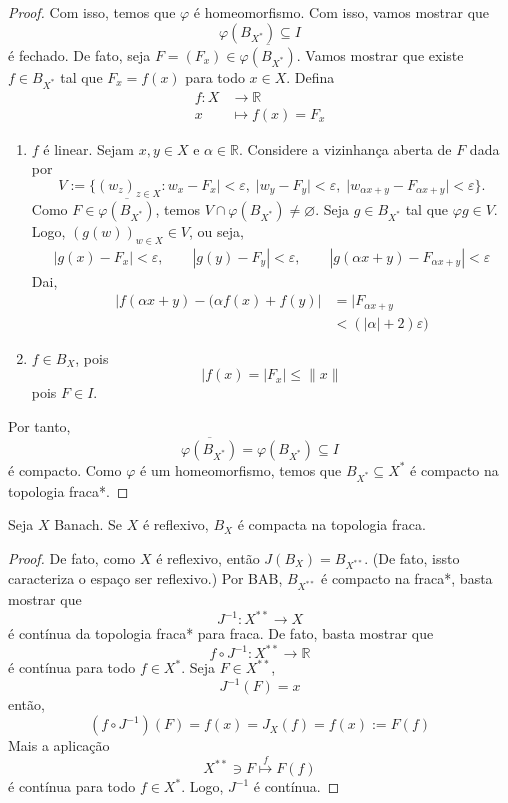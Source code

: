 \documentclass[portuguese]{article}
\theoremstyle{definition}
\newcommand{\R}{\mathbb{R}}
\begin{document}
\begin{proof}
		Com isso, temos que $\varphi$ é homeomorfismo. Com isso, vamos mostrar que
		\[\varphi(B_{X^*})\subseteq I\]
		é fechado. De fato, seja $F=(F_x)\in \overline{\varphi(B_{X^*})}$. Vamos mostrar que existe $f\in B_{X^*}$ tal que $F_x=f(x)$ para todo $x\in X$. Defina
		\begin{align*}
			f:X&\to\R\\
			x&\mapsto f(x)=F_x
		\end{align*}
		\begin{enumerate}
			\item $f$ é linear. Sejam $x,y\in X$ e $\alpha\in\R$. Considere a vizinhança aberta de $F$ dada por
			\[V:=\{(w_z)_{z\in X}:w_x-F_x|<\varepsilon,\; |w_y-F_y|<\varepsilon,\;|w_{\alpha x+y}-F_{\alpha x+y}|<\varepsilon\}.\]
			Como $F\in\overline{\varphi(B_{X^*})}$, temos $V\cap\varphi(B_{X^*})\neq\varnothing$. Seja $g\in B_{X^*}$ tal que $\varphi g\in V$. Logo, $(g(w))_{w\in X}\in V$, ou seja,
			\begin{align*}
				|g(x)-F_x|<\varepsilon,\qquad|g(y)-F_y|<\varepsilon,\qquad|g(\alpha x+y)-F_{\alpha x+y}|<\varepsilon
			\end{align*}
			Dai,
			\begin{align*}
				|f(\alpha x+y)-(\alpha f(x)+f(y)|&=|F_{\alpha x+y}\\
				&<(|\alpha|+2)\varepsilon)
			\end{align*}
			\item $f\in B_X$, pois
			\[|f(x)=|F_x|\leq \| x\|\]
			pois $F\in I$.
		\end{enumerate}
		Por tanto,
		\[\overline{\varphi(B_{X^*})}=\varphi(B_{X^*})\subseteq I\]
		é compacto. Como $\varphi$ é um homeomorfismo, temos que $B_{X^*}\subseteq X^*$ é compacto na topologia fraca*.
	\end{proof}
	\begin{coro}
		Seja $X$ Banach. Se $X$ é reflexivo, $B_X$ é compacta na topologia fraca.
	\end{coro}
	\begin{proof}
		De fato, como $X$ é reflexivo, então $J(B_X)=B_{X^{**}}$. (De fato, issto caracteriza o espaço ser reflexivo.) Por BAB, $B_{X^{**}}$ é compacto na fraca*, basta mostrar que
		\[J^{-1}:X^{**}\to X\]
		é contínua da topologia fraca* para fraca. De fato, basta mostrar que
		\[f\circ J^{-1}:X^{**}\to \R\]
		é contínua para todo $f\in X^*$. Seja $F\in X^{**}$,
		\[J^{-1}(F)=x\]
		então,
		\[(f\circ J^{-1})(F)=f(x)=J_X(f)=f(x):=F(f)\]
		Mais a aplicação
		\[X^{**}\ni F\overset{f}{\mapsto}F(f)\]
		é contínua para todo $f\in X^*$. Logo, $J^{-1}$ é contínua.
	\end{proof}
	
\end{document}
